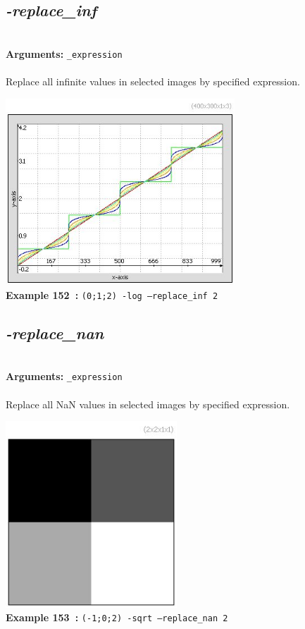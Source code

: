 \documentclass[a4paper,11pt,twoside]{book}
\begin{document}
\subsection{\emph{-replace\_inf} }\vspace*{-0.5em}
~\\\textbf{Arguments: } 
{\small \texttt{\_expression}}\\~\\
Replace all infinite values in selected images by specified expression.
\begin{center}\includegraphics[keepaspectratio=true,height=7cm,width=\textwidth]{img/gmic_def152.jpg}\\
{\footnotesize \textbf{Example 152~:} \texttt{(0;1;2) -log --replace\_inf 2}}
\end{center}

\subsection{\emph{-replace\_nan} }\vspace*{-0.5em}
~\\\textbf{Arguments: } 
{\small \texttt{\_expression}}\\~\\
Replace all NaN values in selected images by specified expression.
\begin{center}\includegraphics[keepaspectratio=true,height=7cm,width=\textwidth]{img/gmic_def153.jpg}\\
{\footnotesize \textbf{Example 153~:} \texttt{(-1;0;2) -sqrt --replace\_nan 2}}
\end{center}
\end{document}
